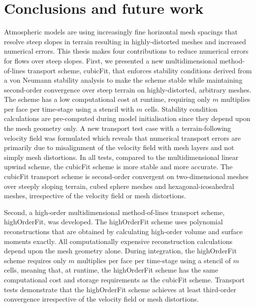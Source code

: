 \chapter{Conclusions and future work}
\label{ch:discussion}

Atmospheric models are using increasingly fine horizontal mesh spacings that resolve steep slopes in terrain resulting in highly-distorted meshes and increased numerical errors.
This thesis makes four contributions to reduce numerical errors for flows over steep slopes.
First, we presented a new multidimensional method-of-lines transport scheme, cubicFit, that enforces stability conditions derived from a von Neumann stability analysis to make the scheme stable while maintaining second-order convergence over steep terrain on highly-distorted, arbitrary meshes.
The scheme has a low computational cost at runtime, requiring only $m$ multiplies per face per time-stage using a stencil with $m$ cells.
Stability condition calculations are pre-computed during model initialisation since they depend upon the mesh geometry only.
A new transport test case with a terrain-following velocity field was formulated which reveals that numerical transport errors are primarily due to misalignment of the velocity field with mesh layers and not simply mesh distortions.
In all tests, compared to the multidimensional linear upwind scheme, the cubicFit scheme is more stable and more accurate.
The cubicFit transport scheme is second-order convergent on two-dimensional meshes over steeply sloping terrain, cubed sphere meshes and hexagonal-icosahedral meshes, irrespective of the velocity field or mesh distortions.

Second, a high-order multidimensional method-of-lines transport scheme, highOrderFit, was developed.
The highOrderFit scheme uses \kexact{} polynomial reconstructions that are obtained by calculating high-order volume and surface moments exactly.
All computationally expensive reconstruction calculations depend upon the mesh geometry alone.
During integration, the highOrderFit scheme requires only $m$ multiplies per face per time-stage using a stencil of $m$ cells, meaning that, at runtime, the highOrderFit scheme has the same computational cost and storage requirements as the cubicFit scheme.
Transport tests demonstrate that the highOrderFit scheme achieves at least third-order convergence irrespective of the velocity field or mesh distortions.

